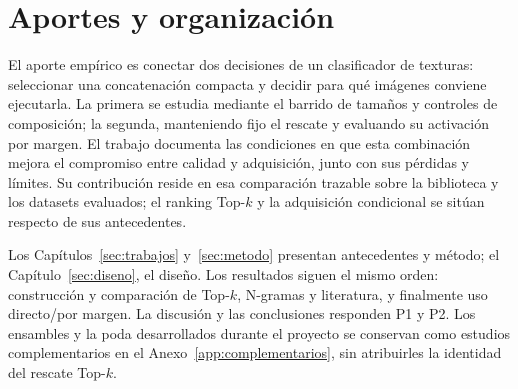 \section{Aportes y organización}
El aporte empírico es conectar dos decisiones de un clasificador de texturas: seleccionar una concatenación compacta y decidir para qué imágenes conviene ejecutarla. La primera se estudia mediante el barrido de tamaños y controles de composición; la segunda, manteniendo fijo el rescate y evaluando su activación por margen. El trabajo documenta las condiciones en que esta combinación mejora el compromiso entre calidad y adquisición, junto con sus pérdidas y límites. Su contribución reside en esa comparación trazable sobre la biblioteca y los datasets evaluados; el ranking Top-\(k\) y la adquisición condicional se sitúan respecto de sus antecedentes.

Los Capítulos~\ref{sec:trabajos} y~\ref{sec:metodo} presentan antecedentes y método; el Capítulo~\ref{sec:diseno}, el diseño. Los resultados siguen el mismo orden: construcción y comparación de Top-\(k\), N-gramas y literatura, y finalmente uso directo/por margen. La discusión y las conclusiones responden P1 y P2. Los ensambles y la poda desarrollados durante el proyecto se conservan como estudios complementarios en el Anexo~\ref{app:complementarios}, sin atribuirles la identidad del rescate Top-\(k\).
